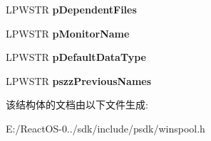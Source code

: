\begin{DoxyCompactItemize}
L\+P\+W\+S\+TR {\bfseries p\+Dependent\+Files}
\item 
\mbox{\label{struct___d_r_i_v_e_r___i_n_f_o__4_w_a90631da8701a5fadebb921012a21b6d9}} 
L\+P\+W\+S\+TR {\bfseries p\+Monitor\+Name}
\item 
\mbox{\label{struct___d_r_i_v_e_r___i_n_f_o__4_w_a489b57f94b6b728a4e12a4dc564fda00}} 
L\+P\+W\+S\+TR {\bfseries p\+Default\+Data\+Type}
\item 
\mbox{\label{struct___d_r_i_v_e_r___i_n_f_o__4_w_a69f1b8fea2d928f79a0de340fcdc1cac}} 
L\+P\+W\+S\+TR {\bfseries pszz\+Previous\+Names}
\end{DoxyCompactItemize}


该结构体的文档由以下文件生成\+:\begin{DoxyCompactItemize}
\item 
E\+:/\+React\+O\+S-\/0../sdk/include/psdk/winspool.\+h\end{DoxyCompactItemize}
